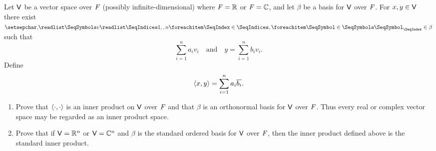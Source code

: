 \begin{ex}\label{ex:6.1.22}
	Let \(\mathsf{V}\) be a vector space over \(\mathit{F}\) (possibly infinite-dimensional) where \(\mathit{F} = \mathbb{R}\) or \(\mathit{F} = \mathbb{C}\), and let \(\beta\) be a basis for \(\mathsf{V}\) over \(\mathit{F}\).
	For \(x, y \in \mathsf{V}\) there exist \(\seq{v}{1,,n} \in \beta\) such that
	\[
		\sum_{i = 1}^n a_i v_i \quad \text{and} \quad y = \sum_{i = 1}^n b_i v_i.
	\]
	Define
	\[
		\left\langle x, y\right\rangle = \sum_{i = 1}^n a_i \overline{b_i}.
	\]
	\begin{enumerate}
		\item Prove that \(\left\langle\cdot, \cdot\right\rangle\) is an inner product on \(\mathsf{V}\) over \(\mathit{F}\) and that \(\beta\) is an orthonormal basis for \(\mathsf{V}\) over \(\mathit{F}\).
		      Thus every real or complex vector space may be regarded as an inner product space.
		\item Prove that if \(\mathsf{V} = \mathbb{R}^n\) or \(\mathsf{V} = \mathbb{C}^n\) and \(\beta\) is the standard ordered basis for \(\mathsf{V}\) over \(\mathit{F}\), then the inner product defined above is the standard inner product.
	\end{enumerate}
\end{ex}

